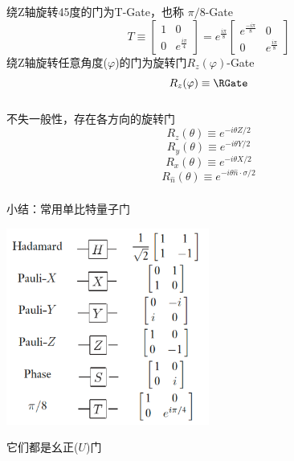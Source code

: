 \begin{frame}
    \frametitle{}
    {\Bullet}绕Z轴旋转45度的门为T-Gate，也称 $\pi/8$-Gate
    \[T \equiv {\begin{bmatrix}
        1 & 0 \\
        0 & e^{\frac{i\pi}{4}}
     \end{bmatrix}} = e^{\frac{i\pi}{8}} {\begin{bmatrix}
        e^{\frac{-i\pi}{8}} & 0 \\
        0 & e^{\frac{i\pi}{8}}
     \end{bmatrix}}\]
    {\Bullet}绕Z轴旋转任意角度($\varphi$)的门为旋转门$R_z(\varphi)$-Gate
    \[R_z(\varphi) \equiv  \RGate \]
\end{frame}

\begin{frame}
    \frametitle{}
    {\Bullet}不失一般性，存在各方向的旋转门
    \[R_z(\theta) \equiv e^{-i\theta Z/2}\]
    \[R_y(\theta) \equiv e^{-i\theta Y/2}\]
    \[R_x(\theta) \equiv e^{-i\theta X/2}\]
    \[R_{\hat{n}}(\theta) \equiv e^{-i\theta \hat{n}\cdot \sigma/2}\]
\end{frame}

\begin{frame}
    \frametitle{}
    小结：常用单比特量子门\\
    \begin{center}
        \includegraphics[width=0.5\textwidth]{figs/15.png}     
    \end{center} 
    它们都是幺正($U$)门
\end{frame}

